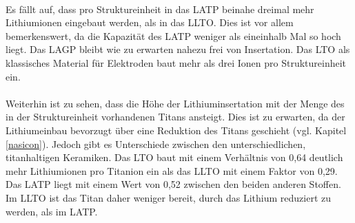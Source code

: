 \documentclass[a4paper, 11pt, headsepline,footsepline,twoside,abstract]{scrbook}
\begin{document}
\\
Es fällt auf, dass pro Struktureinheit in das LATP beinahe dreimal mehr Lithium\-ionen eingebaut werden, als in das LLTO. Dies ist vor allem bemerkenswert, da die Kapazität des LATP weniger als eineinhalb Mal so hoch liegt. Das LAGP bleibt wie zu erwarten nahezu frei von Insertation. Das LTO als klassisches Material für Elektroden baut mehr als drei Ionen pro Struktureinheit ein.
\\\\
Weiterhin ist zu sehen, dass die Höhe der Lithiuminsertation mit der Menge des in der Struktureinheit vorhandenen Titans ansteigt. Dies ist zu erwarten, da der Lithiumeinbau bevorzugt über eine Reduktion des Titans geschieht (vgl. Kapitel \ref{nasicon}). Jedoch gibt es Unterschiede zwischen den unterschiedlichen, titanhaltigen Keramiken. Das LTO baut mit einem Verhältnis von 0,64 deutlich mehr Lithiumionen pro Titanion ein als das LLTO mit einem Faktor von 0,29. Das LATP liegt mit einem Wert von 0,52 zwischen den beiden anderen Stoffen. Im LLTO ist das Titan daher weniger bereit, durch das Lithium reduziert zu werden, als im LATP.
\end{document}
